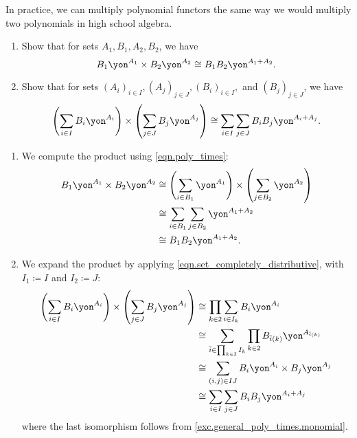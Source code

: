 \documentclass[Book-Poly]{subfiles}
\begin{document}
In practice, we can multiply polynomial functors the same way we would multiply two polynomials in high school algebra.

\begin{exercise} \label{exc.general_poly_times}
  \begin{enumerate}
    \item \label{exc.general_poly_times.monomial} Show that for sets $A_1, B_1, A_2, B_2$, we have
    \[
    B_1\yon^{A_1} \times B_2\yon^{A_2} \iso B_1 B_2\yon^{A_1 + A_2}.
    \]
    \item \label{exc.general_poly_times.polynomial} Show that for sets $(A_i)_{i \in I},(A_j)_{j \in J},(B_i)_{i \in I},$ and $(B_j)_{j \in J}$, we have
    \[
    \left(\sum_{i \in I} B_i\yon^{A_i}\right) \times \left(\sum_{j \in J} B_j\yon^{A_j}\right) \iso \sum_{i \in I} \sum_{j \in J} B_i B_j \yon^{A_i + A_j}.
    \]
  \end{enumerate}
  \begin{solution}
    \begin{enumerate}
      \item We compute the product using \eqref{eqn.poly_times}:
      \begin{align*}
        B_1\yon^{A_1} \times B_2\yon^{A_2} &\iso \left(\sum_{i \in B_1} \yon^{A_1}\right) \times \left(\sum_{j \in B_2} \yon^{A_2}\right) \\
        &\iso \sum_{i \in B_1} \sum_{j \in B_2} \yon^{A_1 + A_2} \\
        &\iso B_1 B_2\yon^{A_1 + A_2}.
      \end{align*}
      \item We expand the product by applying \eqref{eqn.set_completely_distributive}, with $I_1 \coloneqq I$ and $I_2 \coloneqq J$:
      \begin{align*}
        \left(\sum_{i \in I} B_i\yon^{A_i}\right) \times \left(\sum_{j \in J} B_j\yon^{A_j}\right) &\iso \prod_{k \in \2} \sum_{i \in I_k} B_i\yon^{A_i} \\
        &\iso \sum_{\bar{i} \in \prod_{k \in \2} I_k} \prod_{k \in \2} B_{\bar{i}(k)}\yon^{A_{\bar{i}(k)}} \\
        &\iso \sum_{(i,j) \in IJ} B_i\yon^{A_i} \times B_j\yon^{A_j} \\
        &\iso \sum_{i \in I} \sum_{j \in J} B_i B_j \yon^{A_i + A_j}
      \end{align*}
      where the last isomorphism follows from \cref{exc.general_poly_times.monomial}.
    \end{enumerate}
  \end{solution}
\end{exercise}
\end{document}
